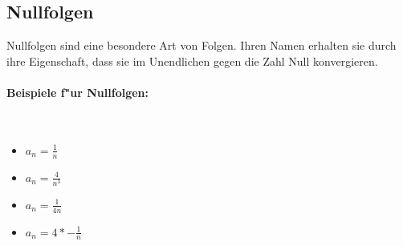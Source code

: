 \subsection{Nullfolgen}
Nullfolgen sind eine besondere Art von Folgen. Ihren Namen erhalten sie durch ihre Eigenschaft, dass sie im Unendlichen gegen die Zahl Null konvergieren.

\paragraph{Beispiele f"ur Nullfolgen:}\hspace{2 cm}\\
\begin{itemize}
\item $ a_n = \frac{1}{n} $
\item $ a_n = \frac{4}{n^3} $
\item $ a_n = \frac{1}{4n}$
\item $ a_n = 4 * -\frac{1}{n} $
\end{itemize}